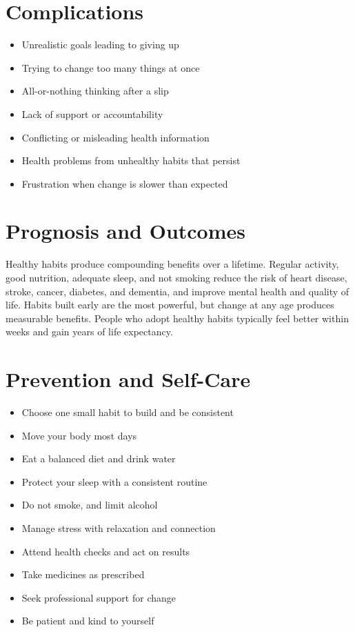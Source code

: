 \section*{Complications}
\begin{itemize}
    \item Unrealistic goals leading to giving up
    \item Trying to change too many things at once
    \item All-or-nothing thinking after a slip
    \item Lack of support or accountability
    \item Conflicting or misleading health information
    \item Health problems from unhealthy habits that persist
    \item Frustration when change is slower than expected
\end{itemize}

\section*{Prognosis and Outcomes}
Healthy habits produce compounding benefits over a lifetime. Regular activity, good nutrition, adequate sleep, and not smoking reduce the risk of heart disease, stroke, cancer, diabetes, and dementia, and improve mental health and quality of life. Habits built early are the most powerful, but change at any age produces measurable benefits. People who adopt healthy habits typically feel better within weeks and gain years of life expectancy.

\section*{Prevention and Self-Care}
\begin{itemize}
    \item Choose one small habit to build and be consistent
    \item Move your body most days
    \item Eat a balanced diet and drink water
    \item Protect your sleep with a consistent routine
    \item Do not smoke, and limit alcohol
    \item Manage stress with relaxation and connection
    \item Attend health checks and act on results
    \item Take medicines as prescribed
    \item Seek professional support for change
    \item Be patient and kind to yourself
\end{itemize}

